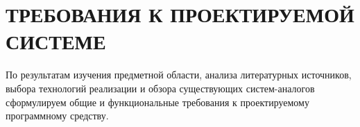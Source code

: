 \section{ТРЕБОВАНИЯ К ПРОЕКТИРУЕМОЙ СИСТЕМЕ}
\label{sec:requirements}

По результатам изучения предметной области, анализа литературных источников, выбора технологий реализации
и обзора существующих систем-аналогов сформулируем общие и функциональные требования к проектируемому 
программному средству.



